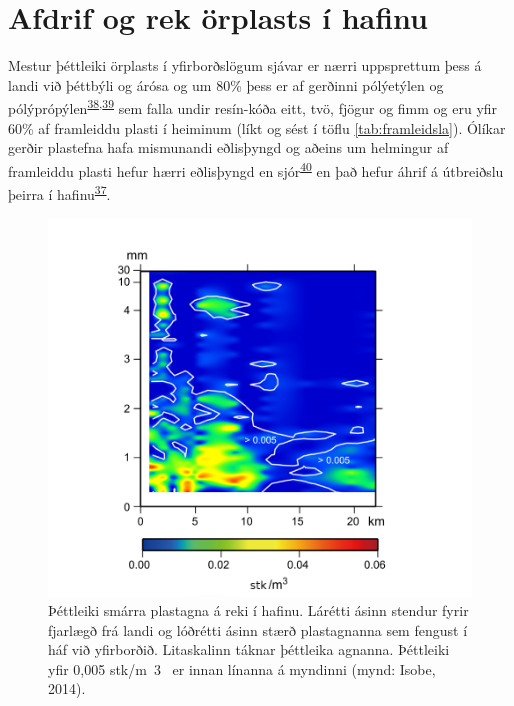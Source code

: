 \documentclass[icelandic,]{book}
\begin{document}
\hypertarget{afdrif-og-rek-orplasts-i-hafinu}{%
\section*{Afdrif og rek örplasts í hafinu}\label{afdrif-og-rek-orplasts-i-hafinu}}

Mestur þéttleiki örplasts í yfirborðslögum sjávar er nærri uppsprettum þess á landi við þéttbýli og árósa og um 80\% þess er af gerðinni pólýetýlen og pólýprópýlen\textsuperscript{\protect\hyperlink{ref-isobe2014selective}{38},\protect\hyperlink{ref-Gewert2017}{39}} sem falla undir resín-kóða eitt, tvö, fjögur og fimm og eru yfir 60\% af framleiddu plasti í heiminum (líkt og sést í töflu \ref{tab:framleidsla}). Ólíkar gerðir plastefna hafa mismunandi eðlisþyngd og aðeins um helmingur af framleiddu plasti hefur hærri eðlisþyngd en sjór\textsuperscript{\protect\hyperlink{ref-sherrington2016study}{40}} en það hefur áhrif á útbreiðslu þeirra í hafinu\textsuperscript{\protect\hyperlink{ref-andrady2011microplastics}{37}}.

\begin{figure}[H]

{\centering \includegraphics[width=0.8\linewidth]{myndir/DriftDensity_isobe2014} 

}

\caption{Þéttleiki smárra plastagna á reki í hafinu. Lárétti ásinn stendur fyrir fjarlægð frá landi og lóðrétti ásinn stærð plastagnanna sem fengust í háf við yfirborðið. Litaskalinn táknar þéttleika agnanna. Þéttleiki yfir 0,005 stk/m~3~ er innan línanna á myndinni (mynd: Isobe, 2014).}\label{fig:DriftDensity}
\end{figure}
\end{document}
